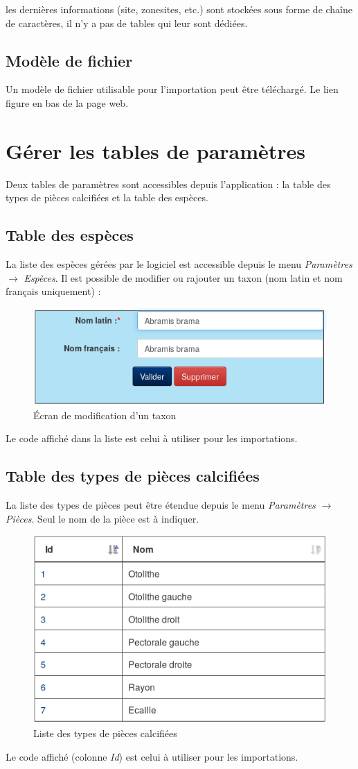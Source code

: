 les dernières informations (site, zonesites, etc.) sont stockées sous forme de chaîne de caractères, il n'y a pas de tables qui leur sont dédiées.

\subsection{Modèle de fichier}

Un modèle de fichier utilisable pour l'importation peut être téléchargé. Le lien figure en bas de la page web.

\section{Gérer les tables de paramètres}
Deux tables de paramètres sont accessibles depuis l'application : la table des types de pièces calcifiées et la table des espèces. 

\subsection{Table des espèces}

La liste des espèces gérées par le logiciel est accessible depuis le menu \textit{Paramètres} $\rightarrow$ \textit{Espèces}. Il est possible de modifier ou rajouter un taxon (nom latin et nom français uniquement) :

\begin{figure}[H]
\centering
\includegraphics[width=0.5\linewidth]{images/espece}
\caption{Écran de modification d'un taxon}
\end{figure}

Le code affiché dans la liste est celui à utiliser pour les importations.

\subsection{Table des types de pièces calcifiées}

La liste des types de pièces peut être étendue depuis le menu \textit{Paramètres} $\rightarrow$ \textit{Pièces}. Seul le nom de la pièce est à indiquer.

\begin{figure}[H]
\centering
\includegraphics[width=0.5\linewidth]{images/piece}
\caption{Liste des types de pièces calcifiées}
\end{figure}

Le code affiché (colonne \textit{Id}) est celui à utiliser pour les importations.

